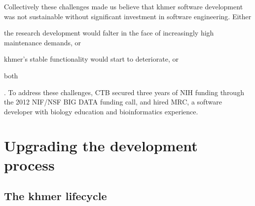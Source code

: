 \documentclass[12pt]{article}
\begin{document}
Collectively these challenges made us believe that khmer software
development was not sustainable without significant investment in
software engineering. Either \begin{inparaenum}[(1)] \item the
  research development would falter in the face of increasingly high
  maintenance demands, or \item khmer's stable functionality would
  start to deteriorate, or \item both\end{inparaenum}.  To address
  these challenges, CTB secured three years of NIH funding through the
  2012 NIF/NSF BIG DATA funding call, and hired MRC, a software developer
  with biology education and bioinformatics experience.





\section{Upgrading the development process}

\subsection{The khmer lifecycle}
\end{document}
